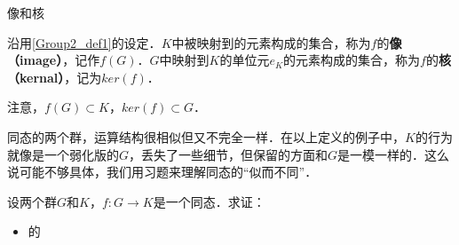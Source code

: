\begin{definition}{像和核}

沿用\autoref{Group2_def1}的设定．$K$中被映射到的元素构成的集合，称为$f$的\textbf{像（image）}，记作$f(G)$．$G$中映射到$K$的单位元$e_K$的元素构成的集合，称为$f$的\textbf{核（kernal）}，记为$ker(f)$．

\end{definition}

注意，$f(G)\subset K$，$ker(f)\subset G$．

同态的两个群，运算结构很相似但又不完全一样．在以上定义的例子中，$K$的行为就像是一个弱化版的$G$，丢失了一些细节，但保留的方面和$G$是一模一样的．这么说可能不够具体，我们用习题来理解同态的“似而不同”．

\begin{exercise}{}\label{Group2_exe1}
设两个群$G$和$K$，$f:G\rightarrow K$是一个同态．求证：
\begin{itemize}
\item {$的$}

\end{itemize}
\end{exercise}
